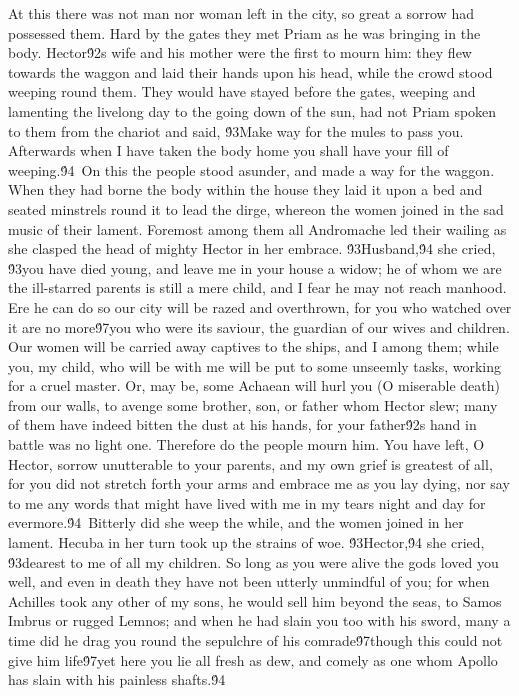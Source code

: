 {At this there was not man nor woman left in the city, so great a sorrow had possessed them. Hard by the gates they met Priam as he was bringing in the body. Hector\'92s wife and his mother were the first to mourn him: they flew towards the waggon and laid their hands upon his head, while the crowd stood weeping round them. They would have stayed before the gates, weeping and lamenting the livelong day to the going down of the sun, had not Priam spoken to them from the chariot and said, \'93Make way for the mules to pass you. Afterwards when I have taken the body home you shall have your fill of weeping.\'94\
On this the people stood asunder, and made a way for the waggon. When they had borne the body within the house they laid it upon a bed and seated minstrels round it to lead the dirge, whereon the women joined in the sad music of their lament. Foremost among them all Andromache led their wailing as she clasped the head of mighty Hector in her embrace. \'93Husband,\'94 she cried, \'93you have died young, and leave me in your house a widow; he of whom we are the ill-starred parents is still a mere child, and I fear he may not reach manhood. Ere he can do so our city will be razed and overthrown, for you who watched over it are no more\'97you who were its saviour, the guardian of our wives and children. Our women will be carried away captives to the ships, and I among them; while you, my child, who will be with me will be put to some unseemly tasks, working for a cruel master. Or, may be, some Achaean will hurl you (O miserable death) from our walls, to avenge some brother, son, or father whom Hector slew; many of them have indeed bitten the dust at his hands, for your father\'92s hand in battle was no light one. Therefore do the people mourn him. You have left, O Hector, sorrow unutterable to your parents, and my own grief is greatest of all, for you did not stretch forth your arms and embrace me as you lay dying, nor say to me any words that might have lived with me in my tears night and day for evermore.\'94\
Bitterly did she weep the while, and the women joined in her lament. Hecuba in her turn took up the strains of woe. \'93Hector,\'94 she cried, \'93dearest to me of all my children. So long as you were alive the gods loved you well, and even in death they have not been utterly unmindful of you; for when Achilles took any other of my sons, he would sell him beyond the seas, to Samos Imbrus or rugged Lemnos; and when he had slain you too with his sword, many a time did he drag you round the sepulchre of his comrade\'97though this could not give him life\'97yet here you lie all fresh as dew, and comely as one whom Apollo has slain with his painless shafts.\'94\
}
